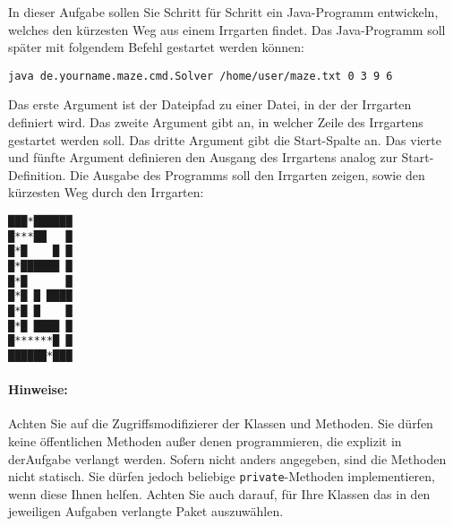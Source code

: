 \documentclass{exam}
\title{\vspace{-1cm}\sffamily{\textbf{Irrgarten-Aufgabe für Java-Vorlesung}}}
\date{}
\begin{document}
\maketitle

\renewcommand{\solutiontitle}{\noindent\textbf{Lösung: }}
\renewcommand{\questionshook}{%
\setlength{\leftmargin}{0pt}%
\setlength{\labelwidth}{-\labelsep}%
}
\noindent{}In dieser Aufgabe sollen Sie Schritt für Schritt ein Java-Programm entwickeln, welches den kürzesten Weg aus einem Irrgarten findet. Das Java-Programm soll später mit folgendem Befehl gestartet werden können:


\begin{lstlisting}
java de.yourname.maze.cmd.Solver /home/user/maze.txt 0 3 9 6
\end{lstlisting}

Das erste Argument ist der Dateipfad zu einer Datei, in der der Irrgarten definiert wird. Das zweite Argument gibt an, in welcher Zeile des Irrgartens gestartet werden soll. Das dritte Argument gibt die Start-Spalte an. Das vierte und fünfte Argument definieren den Ausgang des Irrgartens analog zur Start-Definition. Die Ausgabe des Programms soll den Irrgarten zeigen, sowie den kürzesten Weg durch den Irrgarten:

\begin{center}
\begin{minipage}{2cm}
\begin{verbatim}
███*██████
█***██   █
█*█    █ █
█*██████ █
█*█      █
█*█ █ ████
█*█ █    █
█*█ ████ █
█******█ █
██████*███
\end{verbatim}
\end{minipage}
\end{center}
\paragraph{Hinweise:} Achten Sie auf die Zugriffsmodifizierer der Klassen und Methoden. Sie dürfen keine öffentlichen Methoden außer denen programmieren, die explizit in derAufgabe verlangt werden. Sofern nicht anders angegeben, sind die Methoden nicht statisch. Sie dürfen jedoch beliebige \verb|private|-Methoden implementieren, wenn diese Ihnen helfen. Achten Sie auch darauf, für Ihre Klassen das in den jeweiligen Aufgaben verlangte Paket auszuwählen.
\end{document}
